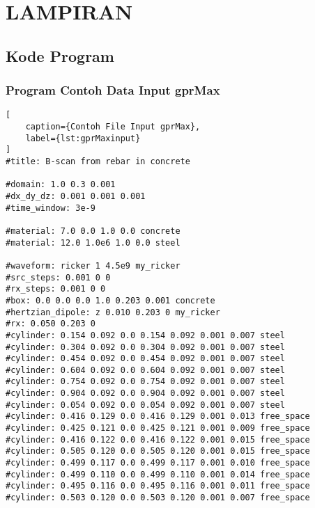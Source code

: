 \chapter*{LAMPIRAN}

\section*{Kode Program}

\subsection*{Program Contoh Data Input gprMax}
\begin{lstlisting}[
    caption={Contoh File Input gprMax},
    label={lst:gprMaxinput}
]
#title: B-scan from rebar in concrete

#domain: 1.0 0.3 0.001
#dx_dy_dz: 0.001 0.001 0.001
#time_window: 3e-9

#material: 7.0 0.0 1.0 0.0 concrete
#material: 12.0 1.0e6 1.0 0.0 steel

#waveform: ricker 1 4.5e9 my_ricker
#src_steps: 0.001 0 0
#rx_steps: 0.001 0 0
#box: 0.0 0.0 0.0 1.0 0.203 0.001 concrete
#hertzian_dipole: z 0.010 0.203 0 my_ricker
#rx: 0.050 0.203 0
#cylinder: 0.154 0.092 0.0 0.154 0.092 0.001 0.007 steel
#cylinder: 0.304 0.092 0.0 0.304 0.092 0.001 0.007 steel
#cylinder: 0.454 0.092 0.0 0.454 0.092 0.001 0.007 steel
#cylinder: 0.604 0.092 0.0 0.604 0.092 0.001 0.007 steel
#cylinder: 0.754 0.092 0.0 0.754 0.092 0.001 0.007 steel
#cylinder: 0.904 0.092 0.0 0.904 0.092 0.001 0.007 steel
#cylinder: 0.054 0.092 0.0 0.054 0.092 0.001 0.007 steel
#cylinder: 0.416 0.129 0.0 0.416 0.129 0.001 0.013 free_space
#cylinder: 0.425 0.121 0.0 0.425 0.121 0.001 0.009 free_space
#cylinder: 0.416 0.122 0.0 0.416 0.122 0.001 0.015 free_space
#cylinder: 0.505 0.120 0.0 0.505 0.120 0.001 0.015 free_space
#cylinder: 0.499 0.117 0.0 0.499 0.117 0.001 0.010 free_space
#cylinder: 0.499 0.110 0.0 0.499 0.110 0.001 0.014 free_space
#cylinder: 0.495 0.116 0.0 0.495 0.116 0.001 0.011 free_space
#cylinder: 0.503 0.120 0.0 0.503 0.120 0.001 0.007 free_space
\end{lstlisting}

